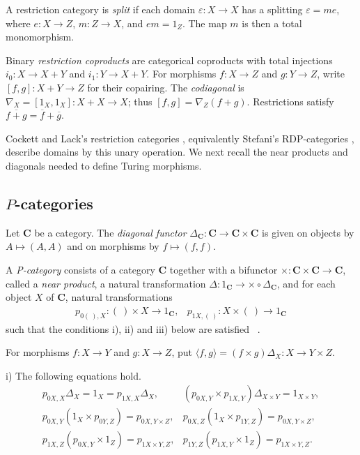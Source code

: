 \documentclass[letterpaper,10pt]{amsart}
\theoremstyle{plain}
\theoremstyle{definition}
\newcommand{\MAP}[3]{{#1}:{#2}\rightarrow{#3}}
\newcommand{\sento}[2]{{#1}\mapsto{#2}}
\newcommand{\rst}[1]{\overline{#1}}
\begin{document}
A restriction category is \textit{split} if each domain
$\varepsilon:X\to X$ has a splitting $\varepsilon=me$, where
$e:X\to Z$, $m:Z\to X$, and $em=1_Z$. The map $m$ is then a
total monomorphism.

Binary \textit{restriction coproducts} are categorical coproducts with
total injections $i_0:X\to X+Y$ and $i_1:Y\to X+Y$. For morphisms
$f:X\to Z$ and $g:Y\to Z$, write $[f,g]:X+Y\to Z$ for their
copairing. The \textit{codiagonal} is
$\nabla_X=[1_X,1_X]:X+X\to X$; thus $[f,g]=\nabla_Z(f+g)$.
Restrictions satisfy $\rst{f+g}=\rst f+\rst g$.

Cockett and Lack's restriction categories \cite{MR1871071,MR1963657},
equivalently Stefani's RDP-categories \cite{MR2003a:18003}, describe
domains by this unary operation. We next recall the near products and
diagonals needed to define Turing morphisms.

\subsection{\texorpdfstring{$P$}{P}-categories}
Let $\mathbf{C}$ be a category. The {\it diagonal functor}
$\MAP{\Delta_\mathbf{C}}{\mathbf C}{\mathbf{C}\times\mathbf{C}}$
is given on objects by $\sento{A}{(A,A)}$ and on morphisms by
$\sento{f}{(f,f)}$.

A {\it P-category} consists of a category $\mathbf{C}$ together
with a bifunctor $\MAP{\times}{\mathbf{C}\times\mathbf{C}}{\mathbf
C}$, called a {\it near product}, a natural transformation
$\MAP{\Delta}{1_\mathbf{C}}{\times\circ\Delta_{\mathbf C}}$, and
for each object $X$ of $\mathbf{C}$, natural transformations
\[
\begin{array}{ll}
p_{0 (\ ),X}:{(\ )\times X}\rightarrow{1_{\mathbf{C}}}, & 
p_{1 X, (\ )}:{X\times (\ ) }\rightarrow{1_{\mathbf{C}}}
\end{array}
\]
such that the conditions i), ii) and iii) below are satisfied ~\cite{coneit}.

For morphisms $f:X\to Y$ and $g:X\to Z$, put
$\langle f,g\rangle=(f\times g)\Delta_X:X\to Y\times Z$.

i) The following equations hold.
\[
\begin{array}{ll} %
p_{0 X,X}\Delta_X=1_X=p_{1 X, X}\Delta_X, & (p_{0 X,Y}\times
p_{1 X,Y})\Delta_{X\times Y}=1_{X\times Y},\\
p_{0 X,Y}(1_X\times p_{0 Y,Z})=p_{0 X,Y\times Z}, & p_{0
X,Z}(1_X\times p_{1 Y,Z})=p_{0 X,Y\times Z},\\
p_{1 X,Z}(p_{0 X,Y}\times 1_Z)=p_{1 X\times Y, Z}, & p_{1
Y,Z}(p_{1 X,Y}\times1_Z )=p_{1 X\times Y, Z}.
\end{array}
\]
\end{document}
